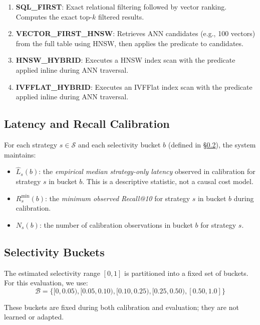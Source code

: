 \documentclass[10pt,twocolumn]{article}
\begin{document}
\begin{enumerate}
\item \textbf{SQL\_FIRST}: Exact relational filtering followed by vector ranking. Computes the exact top-$k$ filtered results.
\item \textbf{VECTOR\_FIRST\_HNSW}: Retrieves ANN candidates (e.g., 100 vectors) from the full table using HNSW, then applies the predicate to candidates.
\item \textbf{HNSW\_HYBRID}: Executes a HNSW index scan with the predicate applied inline during ANN traversal.
\item \textbf{IVFFLAT\_HYBRID}: Executes an IVFFlat index scan with the predicate applied inline during ANN traversal.
\end{enumerate}

\subsection{Latency and Recall Calibration}

For each strategy $s \in \mathcal{S}$ and each selectivity bucket $b$ (defined in \S\ref{sec:buckets}), the system maintains:

\begin{itemize}
\item $\widehat{L}_s(b)$: the \emph{empirical median strategy-only latency} observed in calibration for strategy $s$ in bucket $b$. This is a descriptive statistic, not a causal cost model.
\item $R^{\min}_s(b)$: the \emph{minimum observed Recall@10} for strategy $s$ in bucket $b$ during calibration.
\item $N_s(b)$: the number of calibration observations in bucket $b$ for strategy $s$.
\end{itemize}

\subsection{Selectivity Buckets}
\label{sec:buckets}

The estimated selectivity range $[0, 1]$ is partitioned into a fixed set of buckets. For this evaluation, we use:
\begin{equation}
\mathcal{B} = \{[0, 0.05), [0.05, 0.10), [0.10, 0.25), [0.25, 0.50), [0.50, 1.0]\}
\label{eq:selectivity-buckets}
\end{equation}

These buckets are fixed during both calibration and evaluation; they are not learned or adapted.
\end{document}
